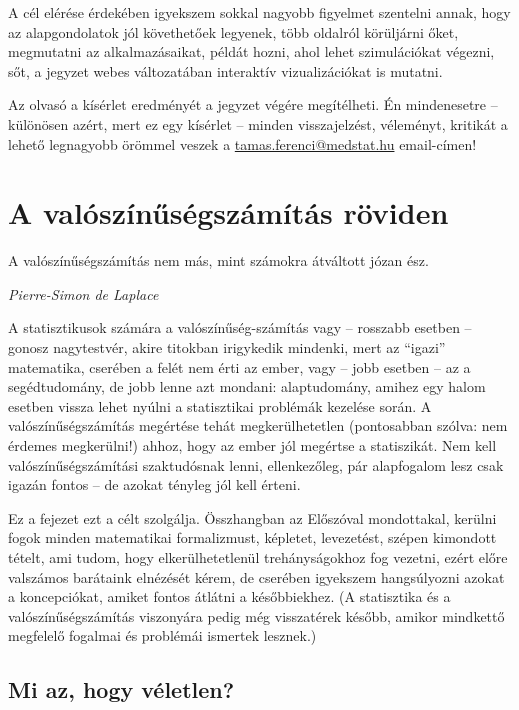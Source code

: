 \documentclass[magyar,]{book}
\begin{document}
A cél elérése érdekében igyekszem sokkal nagyobb figyelmet szentelni annak, hogy az alapgondolatok jól követhetőek legyenek, több oldalról körüljárni őket, megmutatni az alkalmazásaikat, példát hozni, ahol lehet szimulációkat végezni, sőt, a jegyzet webes változatában interaktív vizualizációkat is mutatni.

Az olvasó a kísérlet eredményét a jegyzet végére megítélheti. Én mindenesetre -- különösen azért, mert ez egy kísérlet -- minden visszajelzést, véleményt, kritikát a lehető legnagyobb örömmel veszek a \url{tamas.ferenci@medstat.hu} email-címen!

\hypertarget{a-valuxf3szuxednux171suxe9gszuxe1muxedtuxe1s-ruxf6viden}{%
\chapter{A valószínűségszámítás röviden}\label{a-valuxf3szuxednux171suxe9gszuxe1muxedtuxe1s-ruxf6viden}}

\epigraph{A valószínűségszámítás nem más, mint számokra átváltott józan ész.}{\textit{Pierre-Simon de Laplace}}

A statisztikusok számára a valószínűség-számítás vagy -- rosszabb esetben -- gonosz nagytestvér, akire titokban irigykedik mindenki, mert az \enquote{igazi} matematika, cserében a felét nem érti az ember, vagy -- jobb esetben -- az a segédtudomány, de jobb lenne azt mondani: alaptudomány, amihez egy halom esetben vissza lehet nyúlni a statisztikai problémák kezelése során. A valószínűségszámítás megértése tehát megkerülhetetlen (pontosabban szólva: nem érdemes megkerülni!) ahhoz, hogy az ember jól megértse a statiszikát. Nem kell valószínűségszámítási szaktudósnak lenni, ellenkezőleg, pár alapfogalom lesz csak igazán fontos -- de azokat tényleg jól kell érteni.

Ez a fejezet ezt a célt szolgálja. Összhangban az Előszóval mondottakal, kerülni fogok minden matematikai formalizmust, képletet, levezetést, szépen kimondott tételt, ami tudom, hogy elkerülhetetlenül trehányságokhoz fog vezetni, ezért előre valszámos barátaink elnézését kérem, de cserében igyekszem hangsúlyozni azokat a koncepciókat, amiket fontos átlátni a későbbiekhez. (A statisztika és a valószínűségszámítás viszonyára pedig még visszatérek később, amikor mindkettő megfelelő fogalmai és problémái ismertek lesznek.)

\hypertarget{mi-az-hogy-vuxe9letlen}{%
\section{Mi az, hogy véletlen?}\label{mi-az-hogy-vuxe9letlen}}
\end{document}
